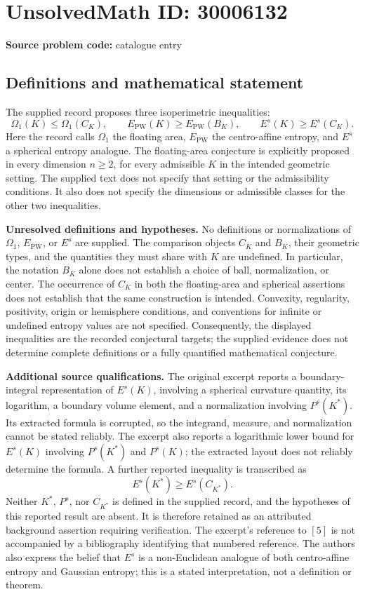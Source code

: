 \documentclass[11pt]{article}
\begin{document}
\section*{UnsolvedMath ID: 30006132}
\textbf{Source problem code:} catalogue entry
\subsection{Definitions and mathematical statement}
The supplied record proposes three isoperimetric inequalities:
\[
\Omega_1(K)\leq\Omega_1(C_K),\qquad
E_{\mathrm{PW}}(K)\geq E_{\mathrm{PW}}(B_K),\qquad
E^s(K)\geq E^s(C_K).
\]
Here the record calls \(\Omega_1\) the floating area, \(E_{\mathrm{PW}}\) the centro-affine entropy, and \(E^s\) a spherical entropy analogue. The floating-area conjecture is explicitly proposed in every dimension \(n\geq 2\), for every admissible \(K\) in the intended geometric setting. The supplied text does not specify that setting or the admissibility conditions. It also does not specify the dimensions or admissible classes for the other two inequalities.

\textbf{Unresolved definitions and hypotheses.} No definitions or normalizations of \(\Omega_1\), \(E_{\mathrm{PW}}\), or \(E^s\) are supplied. The comparison objects \(C_K\) and \(B_K\), their geometric types, and the quantities they must share with \(K\) are undefined. In particular, the notation \(B_K\) alone does not establish a choice of ball, normalization, or center. The occurrence of \(C_K\) in both the floating-area and spherical assertions does not establish that the same construction is intended. Convexity, regularity, positivity, origin or hemisphere conditions, and conventions for infinite or undefined entropy values are not specified. Consequently, the displayed inequalities are the recorded conjectural targets; the supplied evidence does not determine complete definitions or a fully quantified mathematical conjecture.

\textbf{Additional source qualifications.} The original excerpt reports a boundary-integral representation of \(E^s(K)\), involving a spherical curvature quantity, its logarithm, a boundary volume element, and a normalization involving \(P^s(K^*)\). Its extracted formula is corrupted, so the integrand, measure, and normalization cannot be stated reliably. The excerpt also reports a logarithmic lower bound for \(E^s(K)\) involving \(P^s(K^*)\) and \(P^s(K)\); the extracted layout does not reliably determine the formula. A further reported inequality is transcribed as
\[
E^s(K^*)\geq E^s(C_{K^*}).
\]
Neither \(K^*\), \(P^s\), nor \(C_{K^*}\) is defined in the supplied record, and the hypotheses of this reported result are absent. It is therefore retained as an attributed background assertion requiring verification. The excerpt's reference to \([5]\) is not accompanied by a bibliography identifying that numbered reference. The authors also express the belief that \(E^s\) is a non-Euclidean analogue of both centro-affine entropy and Gaussian entropy; this is a stated interpretation, not a definition or theorem.
\end{document}
